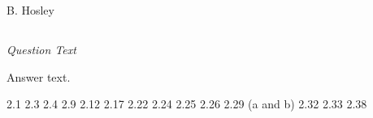 \documentclass[12pt]{amsart}
\begin{document}
\raggedbottom

\hspace{\fill} {\large B. Hosley}
\bigskip


\setcounter{subsection}{0}

\subsection{}
\textit{Question Text}

Answer text.

2.1
2.3
2.4
2.9
2.12
2.17
2.22
2.24
2.25
2.26
2.29 (a and b)
2.32
2.33
2.38
\end{document}
